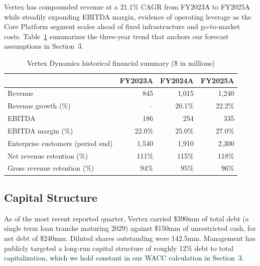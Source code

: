 Vertex has compounded revenue at a 21.1\% CAGR from FY2023A to FY2025A while steadily expanding EBITDA margin, evidence of operating leverage as the Core Platform segment scales ahead of fixed infrastructure and go-to-market costs. Table~\ref{tab:historicals} summarizes the three-year trend that anchors our forecast assumptions in Section~3.

\begin{table}[H]
\centering
\small
\caption{Vertex Dynamics historical financial summary (\$ in millions)}
\label{tab:historicals}
\begin{tabular}{@{}lrrr@{}}
\toprule
& \textbf{FY2023A} & \textbf{FY2024A} & \textbf{FY2025A} \\
\midrule
Revenue & 845 & 1,015 & 1,240 \\
Revenue growth (\%) & -- & 20.1\% & 22.2\% \\
EBITDA & 186 & 254 & 335 \\
EBITDA margin (\%) & 22.0\% & 25.0\% & 27.0\% \\
Enterprise customers (period end) & 1,540 & 1,910 & 2,300 \\
Net revenue retention (\%) & 111\% & 115\% & 118\% \\
Gross revenue retention (\%) & 94\% & 95\% & 96\% \\
\bottomrule
\end{tabular}
\end{table}

\subsection{Capital Structure}

As of the most recent reported quarter, Vertex carried \$390mm of total debt (a single term loan tranche maturing 2029) against \$150mm of unrestricted cash, for net debt of \$240mm. Diluted shares outstanding were 142.5mm. Management has publicly targeted a long-run capital structure of roughly 12\% debt to total capitalization, which we hold constant in our WACC calculation in Section~3.
